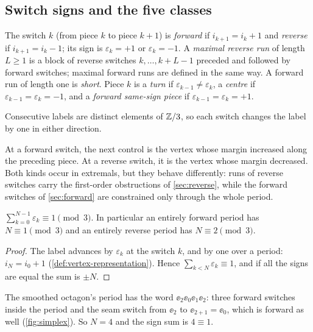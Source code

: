 \subsection{Switch signs and the five classes}\label{sec:per-classes}

\begin{definition}\label{def:signs}
The switch $k$ (from piece $k$ to piece $k+1$) is \emph{forward} if $i_{k+1}=i_k+1$ and
\emph{reverse} if $i_{k+1}=i_k-1$; its sign is $\varepsilon_k=+1$ or $\varepsilon_k=-1$. A \emph{maximal reverse
run} of length $L\ge1$ is a block of reverse switches $k,\dots,k+L-1$ preceded and followed by
forward switches; maximal forward runs are defined in the same way. A forward run of length one
is \emph{short}. Piece $k$ is a \emph{turn} if $\varepsilon_{k-1}\ne\varepsilon_k$, a \emph{centre} if
$\varepsilon_{k-1}=\varepsilon_k=-1$, and a \emph{forward same-sign piece} if $\varepsilon_{k-1}=\varepsilon_k=+1$.
\end{definition}

Consecutive labels are distinct elements of $\mathbb{Z}/3$, so each switch changes the label by one in
either direction.



At a forward switch, the next control is the vertex whose margin increased along the preceding
piece. At a reverse switch, it is the vertex whose margin decreased. Both kinds occur in
extremals, but they behave differently: runs of reverse switches carry the first-order
obstructions of \cref{sec:reverse}, while the forward switches of \cref{sec:forward} are
constrained only through the whole period.

\begin{lemma}\label{lem:sign-sum}
$\sum_{k=0}^{N-1}\varepsilon_k\equiv1\pmod 3$. In particular an entirely forward period has
$N\equiv1\pmod3$ and an entirely reverse period has $N\equiv2\pmod3$.
\end{lemma}

\begin{proof}
The label advances by $\varepsilon_k$ at the switch $k$, and by one over a period:
$i_N=i_0+1$ (\cref{def:vertex-representation}). Hence $\sum_{k<N}\varepsilon_k\equiv1$, and if
all the signs are equal the sum is $\pm N$.
\end{proof}

The smoothed octagon's period has the word $\ee_2\ee_0\ee_1\ee_2$: three forward switches inside
the period and the seam switch from $\ee_2$ to $\ee_{2+1}=\ee_0$, which is forward as well
(\cref{fig:simplex}). So $N=4$ and the sign sum is $4\equiv1$.



